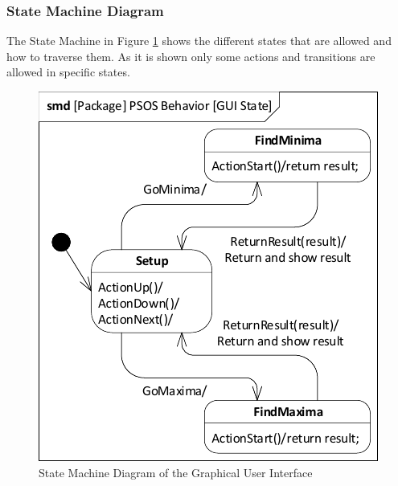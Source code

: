 \subsubsection{State Machine Diagram}\label{req:smd}

The State Machine in Figure \ref{fig:smdguistate} shows the different states that are allowed and how to traverse them. As it is shown only some actions and transitions are allowed in specific states.

\begin{figure}[H]
	\centering
	\includegraphics[width=0.7\linewidth]{diagram/smd_gui_state}
	\caption{State Machine Diagram of the Graphical User Interface}
	\label{fig:smdguistate}
\end{figure}
